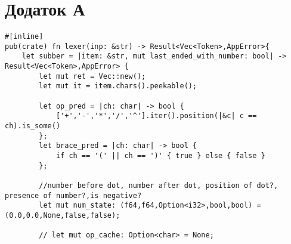 
\section{Додаток А}

\begin{verbatim}
#[inline]
pub(crate) fn lexer(inp: &str) -> Result<Vec<Token>,AppError>{
    let subber = |item: &str, mut last_ended_with_number: bool| -> Result<Vec<Token>,AppError> {
        let mut ret = Vec::new();
        let mut it = item.chars().peekable();

        let op_pred = |ch: char| -> bool {
            ['+','-','*','/','^'].iter().position(|&c| c == ch).is_some()
        };
        let brace_pred = |ch: char| -> bool {
            if ch == '(' || ch == ')' { true } else { false }
        };

        //number before dot, number after dot, position of dot?, presence of number?,is negative?
        let mut num_state: (f64,f64,Option<i32>,bool,bool) = (0.0,0.0,None,false,false);

        // let mut op_cache: Option<char> = None;


\end{verbatim}

